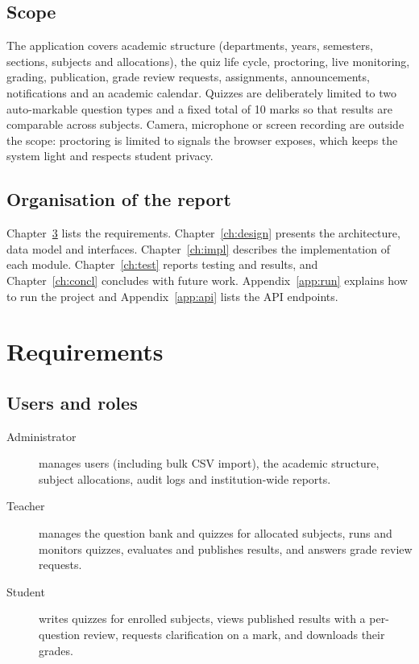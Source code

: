 \documentclass[12pt,a4paper,oneside]{report}
\begin{document}
\section{Scope}
The application covers academic structure (departments, years, semesters, sections, subjects and allocations), the
quiz life cycle, proctoring, live monitoring, grading, publication, grade review requests, assignments, announcements,
notifications and an academic calendar. Quizzes are deliberately limited to two auto-markable question types and a
fixed total of 10 marks so that results are comparable across subjects. Camera, microphone or screen recording are
outside the scope: proctoring is limited to signals the browser exposes, which keeps the system light and respects
student privacy.

\section{Organisation of the report}
Chapter~\ref{ch:req} lists the requirements. Chapter~\ref{ch:design} presents the architecture, data model and
interfaces. Chapter~\ref{ch:impl} describes the implementation of each module. Chapter~\ref{ch:test} reports testing
and results, and Chapter~\ref{ch:concl} concludes with future work. Appendix~\ref{app:run} explains how to run the
project and Appendix~\ref{app:api} lists the API endpoints.

\chapter{Requirements}
\label{ch:req}

\section{Users and roles}
\begin{description}
  \item[Administrator] manages users (including bulk CSV import), the academic structure, subject allocations, audit logs and institution-wide reports.
  \item[Teacher] manages the question bank and quizzes for allocated subjects, runs and monitors quizzes, evaluates and publishes results, and answers grade review requests.
  \item[Student] writes quizzes for enrolled subjects, views published results with a per-question review, requests clarification on a mark, and downloads their grades.
\end{description}
\end{document}
